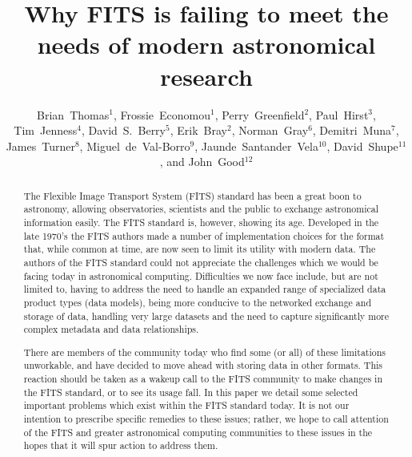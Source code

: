 \documentclass[11pt,twoside]{article}
\begin{document}
\title{Why FITS is failing to meet the needs of modern astronomical
  research}
\author{Brian~Thomas$^1$, Frossie~Economou$^1$, Perry~Greenfield$^2$,
Paul~Hirst$^3$, Tim~Jenness$^4$, David~S.~Berry$^5$, Erik~Bray$^2$,
Norman~Gray$^6$, Demitri~Muna$^7$, James~Turner$^8$,
Miguel~de~Val-Borro$^9$, Jaunde~Santander~Vela$^{10}$,
David~Shupe$^{11}$, and John~Good$^{12}$
}

\begin{abstract}
  The Flexible Image Transport System (FITS) standard has been a great
  boon to astronomy, allowing observatories, scientists and the public
  to exchange astronomical information easily. The FITS standard is,
  however, showing its age. Developed in the late 1970's the FITS
  authors made a number of implementation choices for the format that,
  while common at time, are now seen to limit its utility with modern
  data. The authors of the FITS standard could not appreciate the
  challenges which we would be facing today in astronomical
  computing. Difficulties we now face include, but are not limited to,
  having to address the need to handle an expanded range of
  specialized data product types (data models), being more conducive
  to the networked exchange and storage of data, handling very large
  datasets and the need to capture significantly more complex metadata
  and data relationships.

  There are members of the community today who find some (or all) of
  these limitations unworkable, and have decided to move ahead with
  storing data in other formats. This reaction should be taken as a
  wakeup call to the FITS community to make changes in the FITS
  standard, or to see its usage fall. In this paper we detail some
  selected important problems which exist within the FITS standard
  today.  It is not our intention to prescribe specific remedies to
  these issues; rather, we hope to call attention of the FITS and
  greater astronomical computing communities to these issues in the
  hopes that it will spur action to address them.
\end{abstract}
\end{document}
